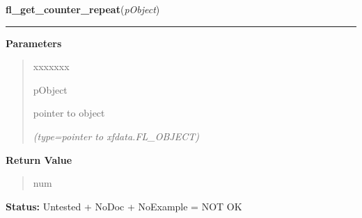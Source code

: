 \hspace{.8\funcindent}\begin{boxedminipage}{\funcwidth}

    \raggedright \textbf{fl\_get\_counter\_repeat}(\textit{pObject})

    \vspace{-1.5ex}

    \rule{\textwidth}{0.5\fboxrule}
\setlength{\parskip}{2ex}
\setlength{\parskip}{1ex}
      \textbf{Parameters}
      \vspace{-1ex}

      \begin{quote}
        \begin{Ventry}{xxxxxxx}

          \item[pObject]

          pointer to object

            {\it (type=pointer to xfdata.FL\_OBJECT)}

        \end{Ventry}

      \end{quote}

      \textbf{Return Value}
    \vspace{-1ex}

      \begin{quote}
      num

      \end{quote}

\textbf{Status:} Untested + NoDoc + NoExample = NOT OK



    \end{boxedminipage}

    \label{xformslib:library:fl_set_counter_repeat}

    \vspace{0.5ex}

